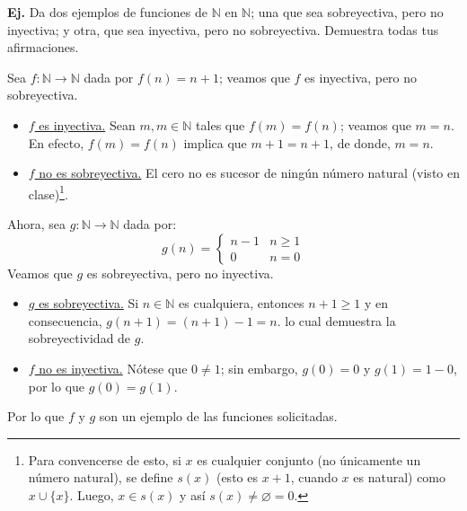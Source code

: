 \documentclass[letterpaper,DIV=14,headsepline,12pt]{scrartcl}
\makeatletter
\newcounter{Ejer}
\newcommand{\pts}{}
\newenvironment{ejercicio}[1]{\noindent
    \ifthenelse{\equal{#1}{1}}{\renewcommand{\pts}{\textbf{(#1 pt)}}}{\renewcommand{\pts}{\textbf{(#1 pts)}}}\textbf{Ej. \theEjer} \pts\stepcounter{Ejer}}{\vspace{.3cm}}
\renewcommand{\emptyset}{\varnothing}
\newenvironment{solucion}[1][]{%
        \par\pushQED{\hfill \lozenge}%
        \normalfont\topsep6pt \partopsep0pt %
        \trivlist
        \item[\hskip\labelsep
                \textbf{\textit{Solución.}}%
        ]#1
        }{%
        \popQED\endtrivlist\@endpefalse
    }
\makeatother
\begin{document}
    \begin{ejercicio}{1}
        Da dos ejemplos de funciones de $\mathbb{N}$ en $\mathbb{N}$; una que sea sobreyectiva, pero no inyectiva; y otra, que sea inyectiva, pero no sobreyectiva. Demuestra todas tus afirmaciones.
    \end{ejercicio}
    \begin{solucion}
        Sea $f:\mathbb{N} \to \mathbb{N}$ dada por $f(n) = n + 1$; veamos que $f$ es inyectiva, pero no sobreyectiva.
        \begin{itemize}
            \item \underline{$f$ es inyectiva.} Sean $m,m \in \mathbb{N}$ tales que $f(m) = f(n)$; veamos que $m=n$. En efecto, $f(m) = f(n)$ implica que $m+1=n+1$, de donde, $m=n$.
            \item \underline{$f$ no es sobreyectiva.} El cero no es sucesor de ningún número natural (visto en clase)\footnote{Para convencerse de esto, si $x$ es cualquier conjunto (no únicamente un número natural), se define $s(x)$ (esto es $x+1$, cuando $x$ es natural) como $x \cup \{x\}$. Luego, $x \in s(x)$ y así $s(x)\neq \emptyset = 0$.}.
        \end{itemize}
        Ahora, sea $g:\mathbb{N} \to \mathbb{N}$ dada por:
        \[ g(n) = \begin{cases}
            n-1 & n \geq 1 \\ 
            0 & n = 0
        \end{cases} \]
        Veamos que $g$ es sobreyectiva, pero no inyectiva.
        \begin{itemize}
            \item \underline{$g$ es sobreyectiva.} Si $n \in \mathbb{N}$ es cualquiera, entonces $n+1 \geq 1$ y en consecuencia, $g(n+1) = (n+1) - 1 = n$. lo cual demuestra la sobreyectividad de $g$.
            \item \underline{$f$ no es inyectiva.} Nótese que $0 \neq 1$; sin embargo, $g(0) = 0$ y $g(1)=1-0$, por lo que $g(0) = g(1)$.
        \end{itemize}
        Por lo que $f$ y $g$ son un ejemplo de las funciones solicitadas.
    \end{solucion}
\end{document}
